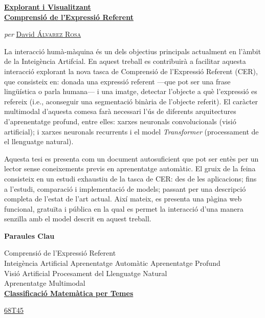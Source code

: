 \clearpage
\thispagestyle{plain}
\null\vfill

\begin{otherlanguage}{catalan}
  \begin{center}
    \Large
    \href{https://recomprehension.com/}{\textbf{Explorant i Visualitzant\\
        Comprensió de l'Expressió Referent}}

    \vspace{2ex} \large \textit{per}
    \href{https://david.alvarezrosa.com/}{David \textsc{Álvarez Rosa}}

    \vspace{3ex} \textbf{\abstractname}
  \end{center}

  \vspace{-2ex}
  \noindent La interacció humà-màquina és un dels objectius principals
  actualment en l'àmbit de la Inte\lgem{}igència Artifcial. En aquest treball
  es contribuirà a facilitar aquesta interacció explorant la nova tasca de
  Comprensió de l'Expressió Referent (CER), que consisteix en: donada una
  expressió referent ---que pot ser una frase lingüística o parla humana--- i
  una imatge, detectar l'objecte a què l'expressió es refereix (i.e.,
  aconseguir una segmentació binària de l'objecte referit). El caràcter
  multimodal d'aquesta comesa farà necessari l'ús de diferents arquitectures
  d'aprenentatge profund, entre elles: xarxes neuronals convolucionals (visió
  artificial); i xarxes neuronals recurrents i el model \textit{Transformer}
  (processament de el llenguatge natural).

  Aquesta tesi es presenta com un document autosuficient que pot ser entès per
  un lector sense coneixements previs en aprenentatge automàtic. El gruix de la
  feina consisteix en un estudi exhaustiu de la tasca de CER: des de les
  aplicacions; fins a l'estudi, comparació i implementació de models; passant
  per una descripció completa de l'estat de l'art actual. Així mateix, es
  presenta una pàgina web funcional, gratuïta i pública en la qual es permet la
  interacció d'una manera senzilla amb el model descrit en aquest treball.

  \begin{center}


    \bigskip\smallskip \textbf{Paraules Clau}

    Comprensió de l'Expressió Referent\\
    Inte\lgem{}igència Artificial \textbullet{} Aprenentatge Automàtic
    \textbullet{} Aprenentatge Profund\\
    Visió Artificial \textbullet{} Procesament del Llenguatge Natural\\
    Aprenentatge Multimodal\\

    \bigskip
    \href{https://mathscinet.ams.org/msc/msc2010.html}{\textbf{Classificació
        Matemàtica per Temes}}

    \href{https://mathscinet.ams.org/msc/msc2010.html?t=68Txx}{68T45}
  \end{center}
\end{otherlanguage}
\vfill\null{}



